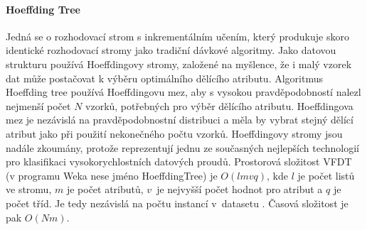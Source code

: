 \documentclass[12pt]{article}
\begin{document}
\paragraph{Hoeffding Tree}
Jedná se o rozhodovací strom s inkrementálním učením, který produkuje skoro identické
rozhodovací stromy jako tradiční dávkové algoritmy. Jako datovou strukturu používá Hoeffdingovy
stromy, založené na myšlence, že i malý vzorek dat může postačovat k výběru
optimálního dělícího atributu.
\newline
\indent 
Algoritmus Hoeffding tree používá Hoeffdingovu mez, aby s vysokou pravděpodobností
nalezl nejmenší počet $N$ vzorků, potřebných pro výběr dělícího atributu. Hoeffdingova mez
je nezávislá na pravděpodobnostní distribuci a měla by vybrat stejný dělící atribut jako při
použití nekonečného počtu vzorků. Hoeffdingovy stromy jsou nadále zkoumány, protože reprezentují jednu ze současných nejlepších technologií pro klasifikaci vysokorychlostních datových proudů. \citep{kirk}
\newline
\indent
Prostorová složitost VFDT (v programu Weka nese jméno HoeffdingTree) je $O(lmvq)$, kde $l$ je počet listů ve stromu, $m$ je počet atributů, $v$~je nejvyšší počet hodnot pro atribut a $q$ je počet tříd. Je tedy nezávislá na počtu instancí v~datasetu \citep{littman}. Časová složitost je pak $O(Nm)$. \citep{evag}
\end{document}
